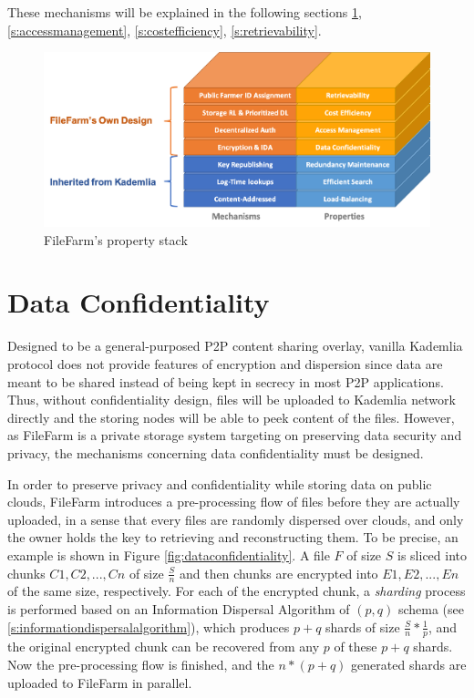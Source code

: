 \noindent These mechanisms will be explained in the following sections \ref{s:dataconfidentiality}, \ref{s:accessmanagement}, \ref{s:costefficiency}, \ref{s:retrievability}.

\begin{figure}[hbt]
\centering
  \includegraphics[width=14cm]{figures/property_stack.png}
  \caption{FileFarm's property stack}
  \label{fig:propertystack}
\end{figure}

\section{Data Confidentiality}
\label{s:dataconfidentiality}

Designed to be a general-purposed P2P content sharing overlay, vanilla Kademlia protocol does not provide features of encryption and dispersion since data are meant to be shared instead of being kept in secrecy in most P2P applications. Thus, without confidentiality design, files will be uploaded to Kademlia network directly and the storing nodes will be able to peek content of the files. However, as FileFarm is a private storage system targeting on preserving data security and privacy, the mechanisms concerning data confidentiality must be designed.

In order to preserve privacy and confidentiality while storing data on public clouds, FileFarm introduces a pre-processing flow of files before they are actually uploaded, in a sense that every files are randomly dispersed over clouds, and only the owner holds the key to retrieving and reconstructing them. To be precise, an example is shown in Figure \ref{fig:dataconfidentiality}. A file $F$ of size $S$ is sliced into chunks $C1, C2, ..., Cn$ of size $\frac{S}{n}$ and then chunks are encrypted into $E1, E2, ..., En$ of the same size, respectively. For each of the encrypted chunk, a \textit{sharding} process is performed based on an Information Dispersal Algorithm of $(p,q)$ schema (see \ref{s:informationdispersalalgorithm}), which produces $p + q$ shards of size $\frac{S}{n}*\frac{1}{p}$, and the original encrypted chunk can be recovered from any $p$ of these $p + q$ shards. Now the pre-processing flow is finished, and the $n * (p + q)$ generated shards are uploaded to FileFarm in parallel.

